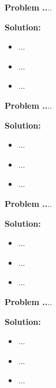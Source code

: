 \documentclass{article}
\theoremstyle{problemstyle}
\newenvironment{boxedproblem}[1]
{\begin{tcolorbox}[colback=white, colframe=black, boxrule=0.5pt]\noindent\textbf{Problem #1.}}
{\end{tcolorbox}}
\begin{document}
    
    \begin{boxedproblem}{20}
    ...
    \end{boxedproblem}
    
    \textbf{Solution:}
    \begin{itemize}[label={},leftmargin=1.25cm,nosep]
        \item ...
        \item ...
        \item ...
    \end{itemize}
    
    
\begin{boxedproblem}{21}
    ...
    \end{boxedproblem}
    
    \textbf{Solution:}
    \begin{itemize}[label={},leftmargin=1.25cm,nosep]
        \item ...
        \item ...
        \item ...
    \end{itemize}
    
    
    \begin{boxedproblem}{22}
    ...
    \end{boxedproblem}
    
    \textbf{Solution:}
    \begin{itemize}[label={},leftmargin=1.25cm,nosep]
        \item ...
        \item ...
        \item ...
    \end{itemize}
    
    
    \begin{boxedproblem}{23}
    ...
    \end{boxedproblem}
    
    \textbf{Solution:}
    \begin{itemize}[label={},leftmargin=1.25cm,nosep]
        \item ...
        \item ...
        \item ...
    \end{itemize}
    
\end{document}
